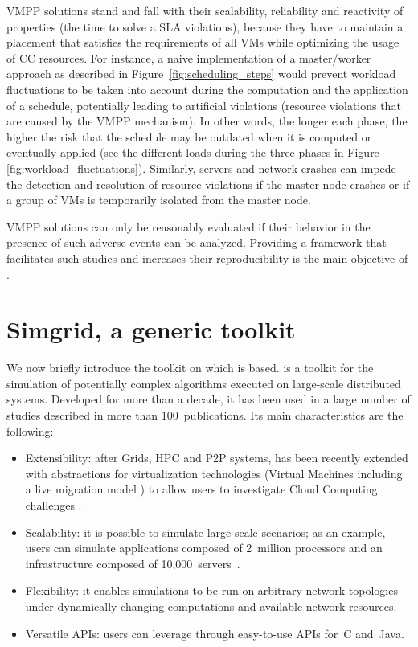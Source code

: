 VMPP solutions stand and fall with their scalability, reliability and
reactivity of properties (\ie the time to solve a SLA violations), because they have to maintain a placement
that satisfies the requirements of all VMs while optimizing the usage
of CC resources. For instance, a naive implementation of a
master/worker approach as described in
Figure~\ref{fig:scheduling_steps} would prevent workload fluctuations
to be taken into account during the computation and the application of
a schedule, potentially leading to artificial violations (\ie resource
violations that are caused by the VMPP mechanism). In other words, the
longer each phase,
the higher the risk that the schedule may be outdated when it is
computed or eventually applied (see the different loads during the
three phases in Figure \ref{fig:workload_fluctuations}). Similarly,
servers and network crashes can impede the detection and resolution of
resource violations if the master node crashes or if a group of VMs is
temporarily isolated from the master node.

VMPP solutions can only be reasonably evaluated if their behavior in
the presence of such adverse events can be analyzed. Providing a
framework that facilitates such studies and increases their
reproducibility is the main objective of \vmps.

\section{Simgrid, a generic toolkit}
\label{sec:sg}

We now briefly introduce the toolkit on which \vmps is based.  \sg is
a toolkit for the simulation of potentially complex algorithms
executed on large-scale distributed systems.  Developed for more than
a decade, it has been used in a large number of studies described in
more than 100~publications.  Its main characteristics are the
following:
\begin{itemize}
  \item Extensibility: after Grids, HPC and P2P systems, \sg has been
    recently extended with abstractions for virtualization
    technologies (\ie Virtual Machines including a live migration
    model \cite{Hirofuchi:2013:ALM:2568486.2568524}) to allow users to
    investigate Cloud Computing challenges \cite{lucas:cloud2014}.
  \item Scalability: it is possible to simulate large-scale scenarios;
    as an example, users can simulate applications composed of
    2~million processors and an infrastructure composed of
    10,000~servers~\cite{casanova:hal-01017319}.
  \item Flexibility: it enables simulations to be run on arbitrary
    network topologies under dynamically changing computations and
    available network resources.
  \item Versatile APIs: users can leverage \sg through easy-to-use
    APIs for~C and~Java.
\end{itemize}


